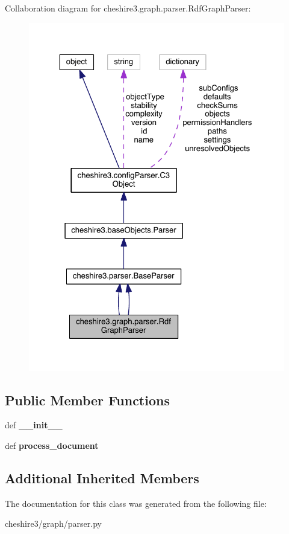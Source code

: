Collaboration diagram for cheshire3.\-graph.\-parser.\-Rdf\-Graph\-Parser\-:
\nopagebreak
\begin{figure}[H]
\begin{center}
\leavevmode
\includegraphics[width=325pt]{classcheshire3_1_1graph_1_1parser_1_1_rdf_graph_parser__coll__graph}
\end{center}
\end{figure}
\subsection*{Public Member Functions}
\begin{DoxyCompactItemize}
\item 
\hypertarget{classcheshire3_1_1graph_1_1parser_1_1_rdf_graph_parser_a258683c779e08e9e114588b8ba848563}{def {\bfseries \-\_\-\-\_\-init\-\_\-\-\_\-}}\label{classcheshire3_1_1graph_1_1parser_1_1_rdf_graph_parser_a258683c779e08e9e114588b8ba848563}

\item 
\hypertarget{classcheshire3_1_1graph_1_1parser_1_1_rdf_graph_parser_a9e1518a2b70fecd5a904dfeebcbb9b80}{def {\bfseries process\-\_\-document}}\label{classcheshire3_1_1graph_1_1parser_1_1_rdf_graph_parser_a9e1518a2b70fecd5a904dfeebcbb9b80}

\end{DoxyCompactItemize}
\subsection*{Additional Inherited Members}


The documentation for this class was generated from the following file\-:\begin{DoxyCompactItemize}
\item 
cheshire3/graph/parser.\-py\end{DoxyCompactItemize}
